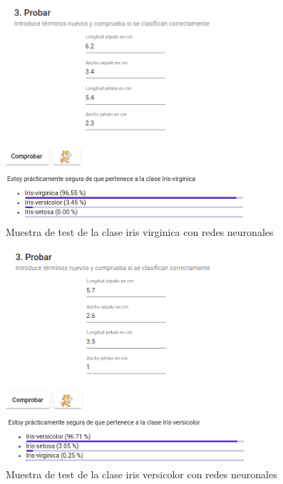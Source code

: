 \documentclass[a4paper, 12pt]{book}
\begin{document}
\begin{figure}
	\centering
	\includegraphics[width=9cm, keepaspectratio]{img/iris_vir_num_rn.png}
	\caption{Muestra de test de la clase iris virginica con redes neuronales} 	\label{fig:ejemplo8}
\end{figure}

\begin{figure}
	\centering
	\includegraphics[width=9cm, keepaspectratio]{img/iris_ver_num_rn.png}
	\caption{Muestra de test de la clase iris versicolor con redes neuronales} 	\label{fig:ejemplo9}
\end{figure}
\end{document}

